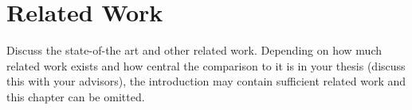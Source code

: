 \chapter{Related Work}
\label{ch:related_work}

Discuss the state-of-the art and other related work.
Depending on how much related work exists and how central the comparison to it is in your thesis (discuss this with your advisors), the introduction may contain sufficient related work and this chapter can be omitted.

